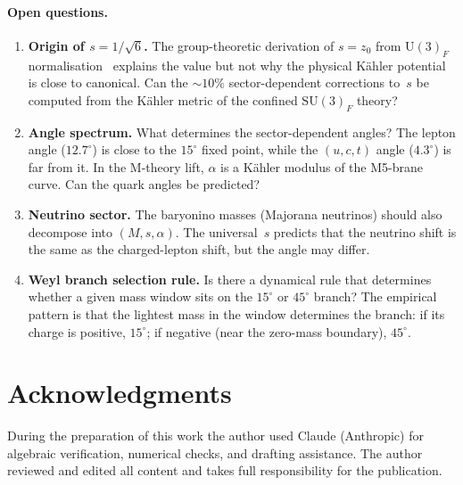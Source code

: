 \documentclass[preprint,12pt]{elsarticle}
\newcommand{\SU}{\mathrm{SU}}
\newcommand{\UU}{\mathrm{U}}
\begin{document}
\paragraph{Open questions.}
\begin{enumerate}
\item \textbf{Origin of $s = 1/\sqrt{6}$.}
  The group-theoretic derivation of $s = z_0$ from
  $\UU(3)_F$ normalisation~\cite{letter_q2} explains the value
  but not why the physical K\"ahler potential is close to canonical.
  Can the $\sim 10\%$ sector-dependent corrections to~$s$ be
  computed from the K\"ahler metric of the confined $\SU(3)_F$ theory?

\item \textbf{Angle spectrum.}
  What determines the sector-dependent angles?
  The lepton angle ($12.7^\circ$) is close to the $15^\circ$
  fixed point, while the $(u,c,t)$ angle ($4.3^\circ$) is far
  from it.  In the M-theory lift, $\alpha$ is a K\"ahler modulus of
  the M5-brane curve.  Can the quark angles be predicted?

\item \textbf{Neutrino sector.}
  The baryonino masses (Majorana neutrinos) should also
  decompose into $(M, s, \alpha)$.  The universal~$s$
  predicts that the neutrino shift is the same
  as the charged-lepton shift, but the angle may differ.

\item \textbf{Weyl branch selection rule.}
  Is there a dynamical rule that determines whether a given
  mass window sits on the $15^\circ$ or $45^\circ$ branch?
  The empirical pattern is that the lightest mass in the
  window determines the branch: if its charge is positive, $15^\circ$;
  if negative (near the zero-mass boundary), $45^\circ$.
\end{enumerate}


\section*{Acknowledgments}

During the preparation of this work the author used Claude
(Anthropic) for algebraic verification, numerical checks,
and drafting assistance.
The author reviewed and edited all content and takes full
responsibility for the publication.
\end{document}
